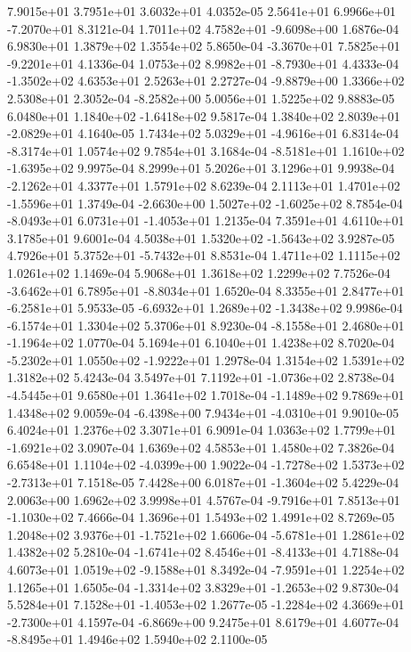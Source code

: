 7.9015e+01 3.7951e+01 3.6032e+01  4.0352e-05
 2.5641e+01  6.9966e+01 -7.2070e+01  8.3121e-04
 1.7011e+02  4.7582e+01 -9.6098e+00  1.6876e-04
6.9830e+01 1.3879e+02 1.3554e+02  5.8650e-04
-3.3670e+01  7.5825e+01 -9.2201e+01  4.1336e-04
 1.0753e+02  8.9982e+01 -8.7930e+01  4.4333e-04
-1.3502e+02  4.6353e+01  2.5263e+01  2.2727e-04
-9.8879e+00  1.3366e+02  2.5308e+01  2.3052e-04
-8.2582e+00  5.0056e+01  1.5225e+02  9.8883e-05
 6.0480e+01  1.1840e+02 -1.6418e+02  9.5817e-04
 1.3840e+02  2.8039e+01 -2.0829e+01  4.1640e-05
 1.7434e+02  5.0329e+01 -4.9616e+01  6.8314e-04
-8.3174e+01  1.0574e+02  9.7854e+01  3.1684e-04
-8.5181e+01  1.1610e+02 -1.6395e+02  9.9975e-04
8.2999e+01 5.2026e+01 3.1296e+01  9.9938e-04
-2.1262e+01  4.3377e+01  1.5791e+02  8.6239e-04
 2.1113e+01  1.4701e+02 -1.5596e+01  1.3749e-04
-2.6630e+00  1.5027e+02 -1.6025e+02  8.7854e-04
-8.0493e+01  6.0731e+01 -1.4053e+01  1.2135e-04
7.3591e+01 4.6110e+01 3.1785e+01  9.6001e-04
 4.5038e+01  1.5320e+02 -1.5643e+02  3.9287e-05
 4.7926e+01  5.3752e+01 -5.7432e+01  8.8531e-04
1.4711e+02 1.1115e+02 1.0261e+02  1.1469e-04
5.9068e+01 1.3618e+02 1.2299e+02  7.7526e-04
-3.6462e+01  6.7895e+01 -8.8034e+01  1.6520e-04
 8.3355e+01  2.8477e+01 -6.2581e+01  5.9533e-05
-6.6932e+01  1.2689e+02 -1.3438e+02  9.9986e-04
-6.1574e+01  1.3304e+02  5.3706e+01  8.9230e-04
-8.1558e+01  2.4680e+01 -1.1964e+02  1.0770e-04
5.1694e+01 6.1040e+01 1.4238e+02  8.7020e-04
-5.2302e+01  1.0550e+02 -1.9222e+01  1.2978e-04
1.3154e+02 1.5391e+02 1.3182e+02  5.4243e-04
 3.5497e+01  7.1192e+01 -1.0736e+02  2.8738e-04
-4.5445e+01  9.6580e+01  1.3641e+02  1.7018e-04
-1.1489e+02  9.7869e+01  1.4348e+02  9.0059e-04
-6.4398e+00  7.9434e+01 -4.0310e+01  9.9010e-05
6.4024e+01 1.2376e+02 3.3071e+01  6.9091e-04
 1.0363e+02  1.7799e+01 -1.6921e+02  3.0907e-04
1.6369e+02 4.5853e+01 1.4580e+02  7.3826e-04
 6.6548e+01  1.1104e+02 -4.0399e+00  1.9022e-04
-1.7278e+02  1.5373e+02 -2.7313e+01  7.1518e-05
 7.4428e+00  6.0187e+01 -1.3604e+02  5.4229e-04
2.0063e+00 1.6962e+02 3.9998e+01  4.5767e-04
-9.7916e+01  7.8513e+01 -1.1030e+02  7.4666e-04
1.3696e+01 1.5493e+02 1.4991e+02  8.7269e-05
 1.2048e+02  3.9376e+01 -1.7521e+02  1.6606e-04
-5.6781e+01  1.2861e+02  1.4382e+02  5.2810e-04
-1.6741e+02  8.4546e+01 -8.4133e+01  4.7188e-04
 4.6073e+01  1.0519e+02 -9.1588e+01  8.3492e-04
-7.9591e+01  1.2254e+02  1.1265e+01  1.6505e-04
-1.3314e+02  3.8329e+01 -1.2653e+02  9.8730e-04
 5.5284e+01  7.1528e+01 -1.4053e+02  1.2677e-05
-1.2284e+02  4.3669e+01 -2.7300e+01  4.1597e-04
-6.8669e+00  9.2475e+01  8.6179e+01  4.6077e-04
-8.8495e+01  1.4946e+02  1.5940e+02  2.1100e-05
